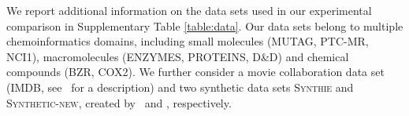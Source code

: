 \documentclass{article}
\begin{document}
\begin{table*}[b]
\caption{Description of the experimental data sets}
\begin{center}
\begin{sc}
\end{sc}
\end{center}
\label{table:data}
\vskip -0.1in
\end{table*}
We report additional information on the data sets used in our experimental comparison in Supplementary Table \ref{table:data}.
Our data sets belong to multiple chemoinformatics domains, including small molecules (\textsc{MUTAG}, \textsc{PTC-MR}, \textsc{NCI1}), macromolecules (\textsc{ENZYMES}, \textsc{PROTEINS}, \textsc{D\&D}) and chemical compounds (\textsc{BZR}, \textsc{COX2}). We further consider a movie collaboration data set (\textsc{IMDB}, see~\citep{yanardag2015deep} for a description) and two synthetic data sets \textsc{Synthie} and \textsc{Synthetic-new}, created by~\citet{morris2016faster} and \citet{feragen2013scalable}, respectively.
\end{document}
